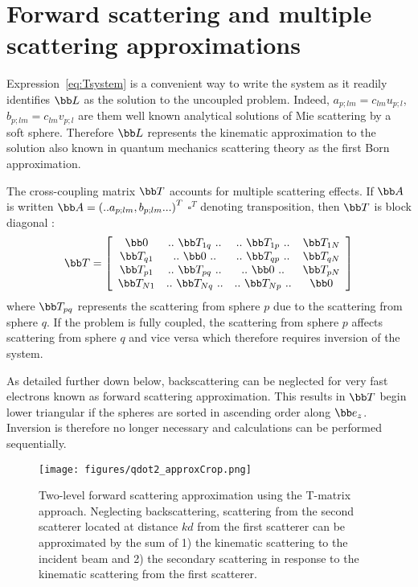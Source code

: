 \section{Forward scattering and multiple scattering approximations}
%
Expression~\eqref{eq:Tsystem} is a convenient way to write the system as it
readily identifies $\bb L$ as the solution to the uncoupled problem.
Indeed,
$a_{p;lm}=c_{lm}u_{p;l}$,
$b_{p;lm}=c_{lm}v_{p;l}$
are them well known analytical solutions of Mie scattering by a soft sphere.
Therefore $\bb L$ represents the kinematic approximation to the solution
also known in quantum mechanics scattering theory as the first Born
approximation.

The cross-coupling matrix $\bb T$ accounts for multiple scattering effects.
If $\bb A$ is written $\bb A=\left(..a_{p;lm},b_{p;lm}...\right)^T$
$\square^T$ denoting transposition, then $\bb T$ is block diagonal :
%
\begin{equation*}
  \bb T =\left[
    \begin{array}{cccc}
      \bb 0      & ..~\bb T_{1q}~.. & ..~\bb T_{1p}~.. & \bb T_{1N}\\
      \bb T_{q1} & ..~\bb 0     ~.. & ..~\bb T_{qp}~.. & \bb T_{qN}\\
      \bb T_{p1} & ..~\bb T_{pq}~.. & ..~\bb 0     ~.. & \bb T_{pN}\\
      \bb T_{N1} & ..~\bb T_{Nq}~.. & ..~\bb T_{Np}~.. & \bb 0     \\
    \end{array}\right]
\end{equation*}
%
where $\bb T_{pq}$ represents the scattering from sphere $p$ due to the
scattering from sphere $q$. If the problem is fully coupled, the scattering
from sphere $p$ affects scattering from sphere $q$ and vice versa which
therefore requires inversion of the system.

As detailed further down below, backscattering can be neglected for very
fast electrons known as forward scattering approximation. This results
in $\bb T$ begin lower triangular if the spheres are sorted in ascending
order along $\bb e_z$. Inversion is therefore no longer necessary and
calculations can be performed sequentially.

\begin{figure}
  \centering
  \texttt{[image: figures/qdot2\_approxCrop.png]}
\caption{Two-level forward scattering approximation using the T-matrix approach.
Neglecting backscattering, scattering from the second scatterer located at
distance $kd$ from the first scatterer can be approximated by the sum of
1) the kinematic scattering to the incident beam and
2) the secondary scattering in response to the kinematic scattering from
the first scatterer. }\label{fig:qdot2_approx}
\end{figure}


